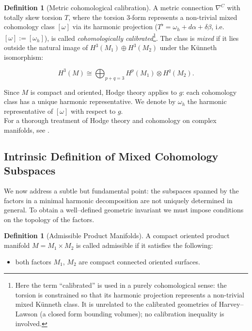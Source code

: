 \documentclass[11pt,reqno]{amsart}
\theoremstyle{plain}
\theoremstyle{definition}
\newtheorem{definition}[theorem]{Definition}
\numberwithin{equation}{section}
\begin{document}
\begin{definition}[Metric cohomological calibration]\label{def:calibration}
A metric connection \( \nabla^C \) with totally skew torsion \(T\), where the torsion 3-form represents a non-trivial mixed cohomology class \([\omega]\) via its harmonic projection (\(T^\flat=\omega_h +d\alpha+\delta \beta\), i.e. \([\omega]:=[\omega_h]\)), is called \emph{cohomologically calibrated}\footnote{Here the term ``calibrated'' is used in a purely cohomological sense: the torsion is constrained so that its harmonic projection represents a non-trivial mixed K\"unneth class. It is unrelated to the calibrated geometries of Harvey--Lawson (a closed form bounding volumes); no calibration inequality is involved.}. The class is \emph{mixed} if it lies outside the natural image of \(H^3(M_1)\oplus H^3(M_2)\) under the K\"unneth isomorphism:

\begin{equation}
H^3(M)\cong \bigoplus_{p+q=3} H^p(M_1)\otimes H^q(M_2).
\end{equation}
\end{definition}

Since \(M\) is compact and oriented, Hodge theory applies to \(g\): each cohomology class has a unique harmonic representative. We denote by \(\omega_h\) the harmonic representative of \([\omega]\) with respect to \(g\).
\\
For a thorough treatment of Hodge theory and cohomology on complex manifolds, see \cite{G-H (1978)}.

\subsection{Intrinsic Definition of Mixed Cohomology Subspaces}
\label{subsec:intrinsic}

We now address a subtle but fundamental point: the subspaces spanned by the factors in a minimal harmonic decomposition are not uniquely determined in general. To obtain a well--defined geometric invariant we must impose conditions on the topology of the factors.

\newcommand{\minrk}{\operatorname{mrk}}

\begin{definition}[Admissible Product Manifolds]\label{def:admissible}
A compact oriented product manifold $M = M_1 \times M_2$ is called admissible if it satisfies the following:
\begin{itemize}
\item[] both factors $M_1$, $M_2$ are compact connected oriented surfaces.
\end{itemize}
\end{definition}
\end{document}
